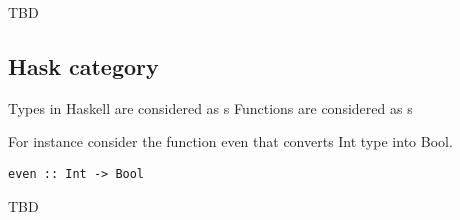\begin{remark}
\label{rem:injection_monomorphism}
TBD
\end{remark}


\subsection{\textbf{Hask} category}
\begin{example}
\label{ex:haskcategory}
Types in Haskell are considered as s
Functions are considered as s

For instance consider the function even that converts Int type
into Bool.
\begin{verbatim}
even :: Int -> Bool
\end{verbatim}
\end{example}


TBD
